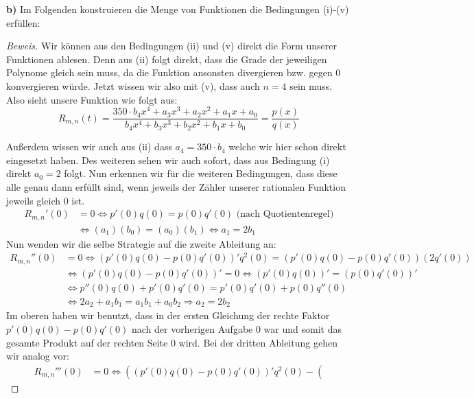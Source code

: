 \documentclass[a4paper]{article}
\begin{document}
\textbf{b)} Im Folgenden konstruieren die Menge von Funktionen die Bedingungen (i)-(v) erfüllen:
\begin{proof}[Beweis]
	Wir können aus den Bedingungen (ii) und (v) direkt die Form unserer Funktionen ablesen. Denn aus (ii)
	folgt direkt, dass die Grade der jeweiligen Polynome gleich sein muss, da die Funktion ansonsten
	divergieren bzw. gegen $0$  konvergieren würde. Jetzt wissen wir also mit (v), dass auch $n = 4$ sein
	muss. Also sieht unsere Funktion wie folgt aus:
	\[
		R_{m, n} (t) = \frac{ 
			350 \cdot b_4 x ^{4} + a_3 x ^{3} + a_2 x ^2 + a_1 x + a_0
			}{ 
			b_4 x ^{4} + b_3 x ^3 + b_2 x ^2 + b_1 x + b_0
		}
		= \frac{ p(x) }{ q(x) }
	\] 

	Außerdem wissen wir auch aus (ii) dass $a_4 = 350 \cdot b_4$ welche wir hier schon direkt eingesetzt haben.
	Des weiteren sehen wir auch sofort, dass aus Bedingung (i) direkt $a_0 = 2$ folgt.
	Nun erkennen wir für die weiteren Bedingungen, dass diese alle genau dann erfüllt sind, wenn jeweils 
	der Zähler unserer rationalen Funktion jeweils gleich 0 ist.
	\begin{align*}
		R_{m, n}'(0) &= 0 \Leftrightarrow p'(0)q(0) = p(0)q'(0) \text{ (nach Quotientenregel)} \\
				  &\Leftrightarrow (a_1)(b_0) = (a_0)(b_1)
				  \Leftrightarrow a_1 = 2 b_1
	\end{align*}
	Nun wenden wir die selbe Strategie auf die zweite Ableitung an:
	\begin{align*}
		R_{m, n} '' (0) &= 0 \Leftrightarrow \left(
				p'(0)q(0) - p(0)q'(0)
			\right) ' q ^2 (0) = \left(
				p'(0)q(0) - p(0)q'(0)
			\right) (2 q' (0)) \\
			&\Leftrightarrow \left(
				p'(0)q(0) - p(0)q'(0)
			\right) ' = 0
			\Leftrightarrow \left(
				p'(0)q(0)
			\right) ' = \left(
				p(0)q'(0)
			\right) ' \\
			&\Leftrightarrow {
				p''(0)q(0) + p'(0)q'(0)
			} = {
				p'(0)q'(0) + p(0)q''(0)
			} \\
			& \Leftrightarrow 2 a_2 + a_1 b_1 = a_1 b_1 + a_0 b_2
			\Rightarrow a_2 = 2 b_2
	\end{align*}
	Im oberen haben wir benutzt, dass in der ersten Gleichung der rechte Faktor $p'(0)q(0) - p(0)q'(0)$
	nach der vorherigen Aufgabe 0 war und somit das gesamte Produkt auf der rechten Seite 0 wird.
	Bei der dritten Ableitung gehen wir analog vor:
	\begin{align*}
		R_{m, n} '''(0) &= 0 \Leftrightarrow \left(
			\left(
				p'(0)q(0) - p(0)q'(0)
			\right) ' q ^2 (0) - \left(

\end{align*}
\end{proof}
\end{document}
